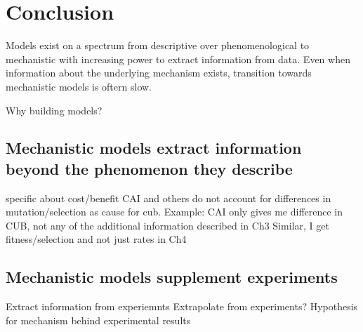 \chapter{Conclusion} \label{ch:conclusion}
Models exist on a spectrum from descriptive over phenomenological to mechanistic with increasing power to extract information from data.
Even when information about the underlying mechanism exists, transition towards mechanistic models is oftern slow.

Why building models?

\section{Mechanistic models extract information beyond the phenomenon they describe}

specific about cost/benefit
CAI and others do not account for differences in mutation/selection as cause for cub.
Example: CAI only gives me difference in CUB, not any of the additional information described in Ch3
Similar, I get fitness/selection and not just rates in Ch4

\section{Mechanistic models supplement experiments}

Extract information from experiemnts
Extrapolate from experiments?
Hypothesis for mechanism behind experimental results


